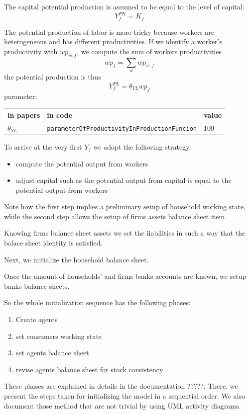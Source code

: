 \documentclass{book}
\begin{document}
The capital potential production is assumed to be equal to the level of capital:
\[
	Y^{PK}_f=K_f
\]

The potential production of labor is more tricky because workers are heterogeneous and has different productivities.
If we identify a worker's productivity with $wp_{w,f}$, we compute the sum of workers productivities
\[
	wp_f=\sum_{w}wp_{w,f}
\]
the potential production is thus
\[
	Y^{PL}_f=\theta_{YL}wp_f
\]
parameter:\\
\begin{tabular}{l l l}
	\hline
	in papers& in code&value\\
	\hline
	\hline
$\theta_{YL}$&\verb+parameterOfProductivityInProductionFuncion+&100\\
	\hline
\end{tabular}

\vskip5mm
To arrive at the very first $Y_f$ we adopt the following strategy. 
\begin{itemize}
	\item compute the potential output from workers
	\item adjust capital such as the potential output from capital is equal to the potential output from workers 
\end{itemize}

Note how the first step implies a preliminary setup of household working state, while the second step allows the setup of firms assets balance sheet item. 

Knowing firms balance sheet assets we set the liabilities in such a way that the balace sheet identity is satisfied.

Next, we initialize the household balance sheet.

Once the amount of households' and firms banks accounts are known, we setup banks balance sheets.

So the whole initialization sequence has the following phases:
\begin{enumerate}
	\item Create agents
	\item set consumers working state
	\item set agents balance sheet
	\item revise agents balance sheet for stock consistency
\end{enumerate}

These phases are explained in details in the documentation ?????. There, we present the steps taken for initializing the model in a sequential order. We also document those method that are not trivial by using UML activity diagrams.
\end{document}
